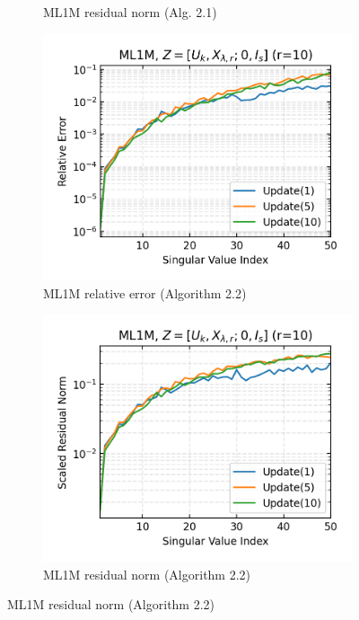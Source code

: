 \begin{figure}[H]
\begin{subfigure}[b]{0.48\textwidth}
    \caption{ML1M residual norm (Alg. 2.1)}
  \end{subfigure}
  \hfill
  \begin{subfigure}[b]{0.48\textwidth}
    \centering
    \includegraphics[width=\textwidth]{figures/ml1m/ML1M_bcg_n_batches_10_k_dims_50_rval_10_rel_err.png}
    \caption{ML1M relative error (Algorithm 2.2)}
  \end{subfigure}
  \hfill
  \begin{subfigure}[b]{0.48\textwidth}
    \centering
    \includegraphics[width=\textwidth]{figures/ml1m/ML1M_bcg_n_batches_10_k_dims_50_rval_10_res_norm.png}
    \caption{ML1M residual norm (Algorithm 2.2)}

\end{subfigure}
\end{figure}
